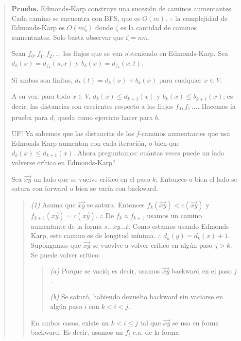 \documentclass[a4paper]{article}
\begin{document}
\small
\begin{quote}

\textbf{Prueba.} Edmonds-Karp construye una sucesión de caminos aumentantes.
Cada camino se encuentra con BFS, que es $O(m)$. $\therefore $ la complejidad
de Edmonds-Karp es $O(m \zeta)$ donde $\zeta$ es la cantidad de caminos
aumentantes. Solo basta observar que $\zeta = nm$. 

Sean $f_0, f_1, f_2, \ldots$ los flujos que se van obteniendo en Edmonds-Karp.
Sea $d_k(x) = d_{f_k}(s, x)$ y $b_k(x) = d_{f_k}(x, t)$.

Si ambas son finitas, $d_k(t) = d_k(x) + b_k(x)$ para cualquier $x \in V$.

A su vez, para todo $x \in V$, $d_k(x) \leq d_{k+1}(x)$ y $b_k(x) \leq b_{k+1}(x)$; es decir, las distancias son crecientes respecto a los flujos $f_0, f_1_, \ldots$. Hacemos la prueba para $d$; queda como ejercicio hacer para $b$.


UF! Ya sabemos que las distancias de los $f$-caminos aumentantes que usa
Edmonds-Karp aumentan con cada iteración, o bien que $d_{k}(x) \leq d_{k+1}(x)$. Ahora preguntamos: cuántas veces puede un lado volverse crítico en Edmonds-Karp? 

Sea $\overrightarrow{xy}$ un lado que se vuelve crítico en el paso $k$.
Entonces o bien el lado se satura con forward o bien se vacía con backward.

\begin{quote}

    \textit{(1)} Asuma que $\overrightarrow{xy}$ se satura. Entonces
    $f_{k}(\overrightarrow{xy}) < c(\overrightarrow{xy})$ y
    $f_{k+1}(\overrightarrow{xy}) = c(\overrightarrow{xy})$. $\therefore $ De
    $f_k$ a $f_{k+1}$ usamos un camino aumentante de la forma $s \ldots xy
    \ldots t$. Como estamos usando Edmonds-Karp, este camino es de longitud
    mínima. $\therefore $ $d_k(y) = d_{k}(x) + 1$. Supongamos que $\overrightarrow{xy}$ se vuevlve a volver crítico en algún paso $j > k$. Se puede volver crítico: 

    \begin{quote}
        \textit{(a)} Porque se vació; es decir, usamos $\overrightarrow{xy}$ backward en el paso $j$. 

        \textit{(b)} Se saturó, habiendo devuelto backward sin vaciarse en
        algún paso $i$ con $k < i < j$.
    \end{quote}

    En ambos casos, existe un $k < i \leq j$ tal que $\overrightarrow{xy}$ se
    usa en forma backward. Es decir, usamos un $f_i$-c.a. de la forma 


\end{quote}
\end{quote}
\end{document}
